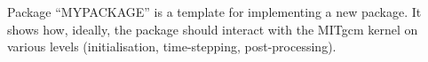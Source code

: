 
Package ``MYPACKAGE'' is a template for implementing a new package.
It shows how, ideally, the package should interact with the
MITgcm kernel on various levels (initialisation, time-stepping,
post-processing).
